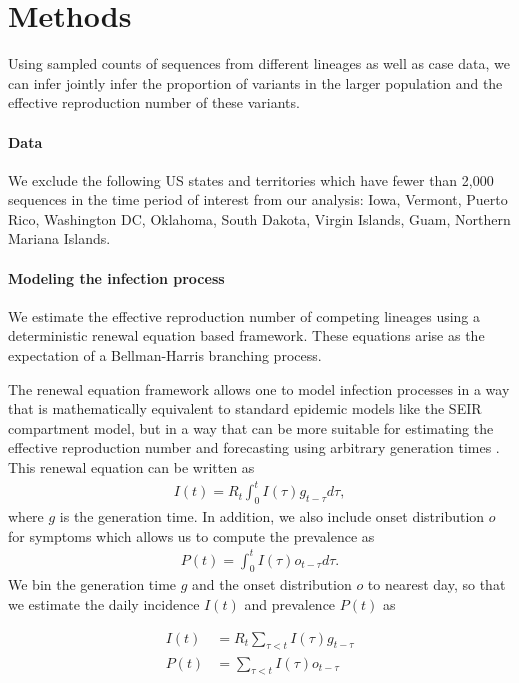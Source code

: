 \documentclass[12pt]{article}
\begin{document}
\section{Methods}

Using sampled counts of sequences from different lineages as well as case data, we can infer jointly infer the proportion of variants in the larger population and the effective reproduction number of these variants. 

\paragraph{Data}

We exclude the following US states and territories which have fewer than 2,000 sequences in the time period of interest from our analysis: Iowa, Vermont, Puerto Rico, Washington DC, Oklahoma, South Dakota, Virgin Islands, Guam, Northern Mariana Islands.

\paragraph{Modeling the infection process}%

We estimate the effective reproduction number of competing lineages using a deterministic renewal equation based framework. These equations arise as the expectation of a Bellman-Harris branching process. \cite{Bellman1948} 

The renewal equation framework allows one to model infection processes in a way that is mathematically equivalent to standard epidemic models like the SEIR compartment model, but in a way that can be more suitable for estimating the effective reproduction number and forecasting using arbitrary generation times \cite{Champredon2018}. This renewal equation can be written as
\begin{align*}
  I(t) = R_{t} \int_{0}^{t} I(\tau)g_{t-\tau} d\tau,
\end{align*}
where $g$ is the generation time. 
In addition, we also include onset distribution $o$ for symptoms which allows us to compute the prevalence as
\begin{align*}
  P(t) = \int_{0}^{t} I(\tau) o_{t-\tau} d \tau.
\end{align*}
We bin the generation time $g$ and the onset distribution $o$ to nearest day, so that we estimate the daily incidence $I(t)$ and prevalence $P(t)$ as

\begin{align*}
  I(t) &= R_{t} \sum_{\tau < t} I(\tau) g_{t-\tau}\\
  P(t) &= \sum_{\tau < t} I(\tau) o_{t-\tau}
\end{align*}
\end{document}
